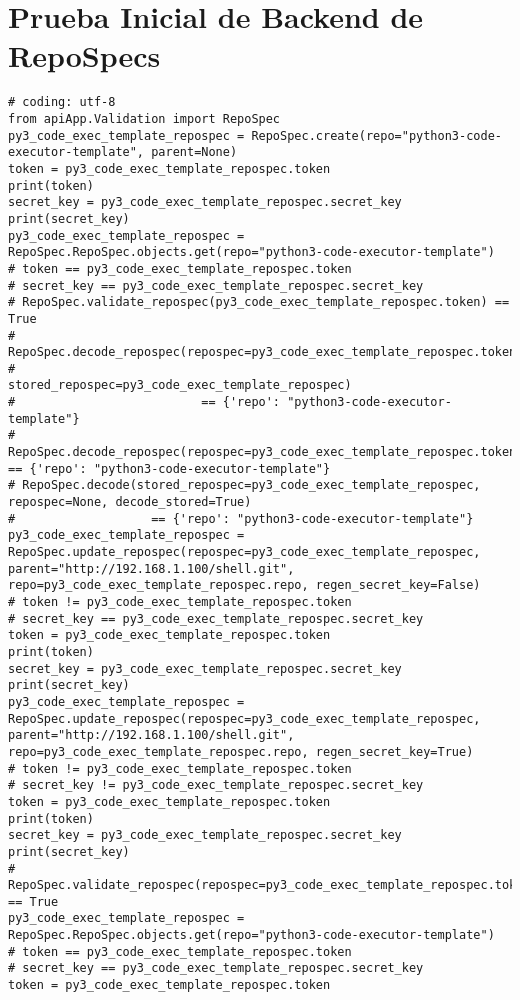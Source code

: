 \section{Prueba Inicial de Backend de RepoSpecs}
\lstset{language=Python}
\begin{lstlisting}[breaklines]
# coding: utf-8
from apiApp.Validation import RepoSpec
py3_code_exec_template_repospec = RepoSpec.create(repo="python3-code-executor-template", parent=None)
token = py3_code_exec_template_repospec.token
print(token)
secret_key = py3_code_exec_template_repospec.secret_key
print(secret_key)
py3_code_exec_template_repospec = RepoSpec.RepoSpec.objects.get(repo="python3-code-executor-template")
# token == py3_code_exec_template_repospec.token
# secret_key == py3_code_exec_template_repospec.secret_key
# RepoSpec.validate_repospec(py3_code_exec_template_repospec.token) == True
# RepoSpec.decode_repospec(repospec=py3_code_exec_template_repospec.token,
#                          stored_repospec=py3_code_exec_template_repospec)
#                          == {'repo': "python3-code-executor-template"}
# RepoSpec.decode_repospec(repospec=py3_code_exec_template_repospec.token) == {'repo': "python3-code-executor-template"}
# RepoSpec.decode(stored_repospec=py3_code_exec_template_repospec, repospec=None, decode_stored=True)
#                   == {'repo': "python3-code-executor-template"}
py3_code_exec_template_repospec = RepoSpec.update_repospec(repospec=py3_code_exec_template_repospec, parent="http://192.168.1.100/shell.git", repo=py3_code_exec_template_repospec.repo, regen_secret_key=False)
# token != py3_code_exec_template_repospec.token
# secret_key == py3_code_exec_template_repospec.secret_key
token = py3_code_exec_template_repospec.token
print(token)
secret_key = py3_code_exec_template_repospec.secret_key
print(secret_key)
py3_code_exec_template_repospec = RepoSpec.update_repospec(repospec=py3_code_exec_template_repospec, parent="http://192.168.1.100/shell.git", repo=py3_code_exec_template_repospec.repo, regen_secret_key=True)
# token != py3_code_exec_template_repospec.token
# secret_key != py3_code_exec_template_repospec.secret_key
token = py3_code_exec_template_repospec.token
print(token)
secret_key = py3_code_exec_template_repospec.secret_key
print(secret_key)
# RepoSpec.validate_repospec(repospec=py3_code_exec_template_repospec.token) == True
py3_code_exec_template_repospec = RepoSpec.RepoSpec.objects.get(repo="python3-code-executor-template")
# token == py3_code_exec_template_repospec.token
# secret_key == py3_code_exec_template_repospec.secret_key
token = py3_code_exec_template_repospec.token

\end{lstlisting}
